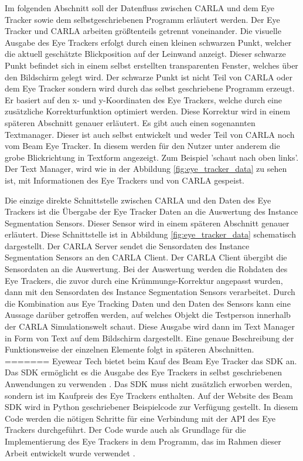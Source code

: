 Im folgenden Abschnitt soll der Datenfluss zwischen CARLA und dem Eye Tracker sowie dem selbstgeschriebenen Programm erläutert werden.
Der Eye Tracker und CARLA arbeiten größtenteils getrennt voneinander. Die visuelle Ausgabe des Eye Trackers erfolgt durch einen kleinen schwarzen Punkt, welcher die aktuell geschätzte Blickposition auf der Leinwand anzeigt. Dieser schwarze Punkt befindet sich in einem selbst erstellten transparenten Fenster, welches über den Bildschirm gelegt wird. Der schwarze Punkt ist nicht Teil von CARLA oder dem Eye Tracker sondern wird durch das selbst geschriebene Programm erzeugt. Er basiert auf den x- und y-Koordinaten des Eye Trackers, welche durch eine zusätzliche Korrekturfunktion optimiert werden. Diese Korrektur wird in einem späteren Abschnitt genauer erläutert. Es gibt auch einen sogenannten Textmanager. Dieser ist auch selbst entwickelt und weder Teil von CARLA noch vom Beam Eye Tracker. In diesem werden für den Nutzer unter anderem die grobe Blickrichtung in Textform angezeigt. Zum Beispiel 'schaut nach oben links'. Der Text Manager, wird wie in der Abbildung \ref{fig:eye_tracker_data} zu sehen ist, mit Informationen des Eye Trackers und von CARLA gespeist.

Die einzige direkte Schnittstelle zwischen CARLA und den Daten des Eye Trackers ist die Übergabe der Eye Tracker Daten an die Auswertung des Instance Segmentation Sensors. Dieser Sensor wird in einem späteren Abschnitt genauer erläutert. Diese Schnittstelle ist in Abbildung \ref{fig:eye_tracker_data} schematisch dargestellt. Der CARLA Server sendet die Sensordaten des Instance Segmentation Sensors an den CARLA Client. Der CARLA Client übergibt die Sensordaten an die Auswertung. Bei der Auswertung werden die Rohdaten des Eye Trackers, die zuvor durch eine Krümmungs-Korrektur angepasst wurden, dann mit den Sensordaten des Instance Segmentation Sensors verarbeitet. Durch die Kombination aus Eye Tracking Daten und den Daten des Sensors kann eine Aussage darüber getroffen werden, auf welches Objekt die Testperson innerhalb der CARLA Simulationswelt schaut. Diese Ausgabe wird dann im Text Manager in Form von Text auf dem Bildschirm dargestellt. Eine genaue Beschreibung der Funktionsweise der einzelnen Elemente folgt in späteren Abschnitten.
=======
Eyewear Tech bietet beim Kauf des Beam Eye Tracker das {\ac{SDK}} an. Das {\ac{SDK}} ermöglicht es die Ausgabe des Eye Trackers in selbst geschriebenen Anwendungen zu verwenden \cite{lit_website_beam_sdk_documentation}. Das {\ac{SDK}} muss nicht zusätzlich erworben werden, sondern ist im Kaufpreis des Eye Trackers enthalten.
Auf der Website des Beam {\ac{SDK}} wird in Python geschriebener Beispielcode zur Verfügung gestellt. In diesem Code werden die nötigen Schritte für eine Verbindung mit der {\ac{API}} des Eye Trackers durchgeführt. Der Code wurde auch als Grundlage für die Implementierung des Eye Trackers in dem Programm, das im Rahmen dieser Arbeit entwickelt wurde verwendet \cite{lit_code_beam_sdk}.


